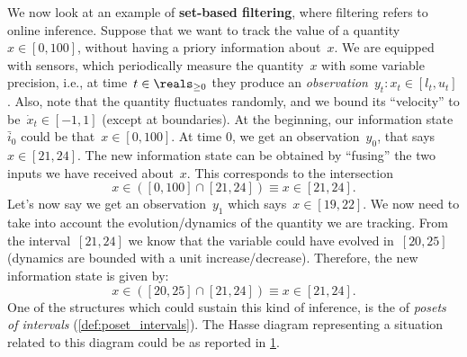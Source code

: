 \begin{example}
    We now look at an example of \textbf{set-based filtering}, where filtering refers to online inference.
    Suppose that we want to track the value of a quantity~$x\in [0,100]$, without having a priory information about~$x$.
    We are equipped with sensors, which periodically measure the quantity~$x$ with some variable precision, i.e., at time~$t\in \reals_{\geq 0}$ they produce an \emph{observation}~$y_t\colon x_t\in [l_t,u_t]$.
    Also, note that the quantity fluctuates randomly, and we bound its ``velocity'' to be~$\dot{x}_t\in [-1,1]$ (except at boundaries).
    At the beginning, our information state~$\bar{i}_0$ could be that~$x\in [0,100]$.
    At time 0, we get an observation~$y_0$, that says~$x\in [21,24]$.
    The new information state can be obtained by ``fusing'' the two inputs we have received about~$x$. This corresponds to the intersection
    \begin{equation*}
        x\in \left( [0,100] \cap [21,24]\right)\equiv x\in [21,24].
    \end{equation*}
    Let's now say we get an observation~$y_1$ which says~$x\in [19,22]$.
    We now need to take into account the evolution/dynamics of the quantity we are tracking. From the interval~$[21,24]$ we know that the variable could have evolved in~$[20,25]$ (dynamics are bounded with a unit increase/decrease). Therefore, the new information state is given by:
    \begin{equation*}
        x\in \left( [20,25] \cap [21,24]\right)\equiv x\in [21,24].
    \end{equation*}
    One of the structures which could sustain this kind of inference, is the of \emph{posets of intervals} (\cref{def:poset_intervals}).
    The Hasse diagram representing a situation related to this diagram could be as reported in \cref{fig:hasse_filtering}.
    \begin{figure}[h!]
        \begin{center}
        \end{center}
        \caption{\label{fig:hasse_filtering}}
    \end{figure}
\end{example}


